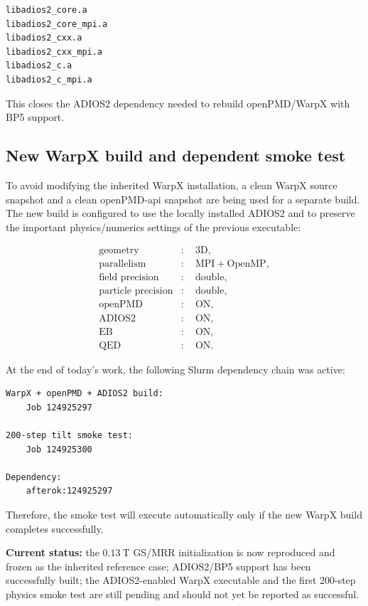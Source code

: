\documentclass[11pt,a4paper]{article}
\begin{document}
\begin{verbatim}
libadios2_core.a
libadios2_core_mpi.a
libadios2_cxx.a
libadios2_cxx_mpi.a
libadios2_c.a
libadios2_c_mpi.a
\end{verbatim}

This closes the ADIOS2 dependency needed to rebuild openPMD/WarpX with BP5
support.

\subsection{New WarpX build and dependent smoke test}

To avoid modifying the inherited WarpX installation, a clean WarpX source
snapshot and a clean openPMD-api snapshot are being used for a separate
build. The new build is configured to use the locally installed ADIOS2 and
to preserve the important physics/numerics settings of the previous
executable:

\begin{align*}
\text{geometry} &:\quad 3\mathrm{D},\\
\text{parallelism} &:\quad \mathrm{MPI}+\mathrm{OpenMP},\\
\text{field precision} &:\quad \mathrm{double},\\
\text{particle precision} &:\quad \mathrm{double},\\
\text{openPMD} &:\quad \mathrm{ON},\\
\text{ADIOS2} &:\quad \mathrm{ON},\\
\text{EB} &:\quad \mathrm{ON},\\
\text{QED} &:\quad \mathrm{ON}.
\end{align*}

At the end of today's work, the following Slurm dependency chain was active:

\begin{verbatim}
WarpX + openPMD + ADIOS2 build:
    Job 124925297

200-step tilt smoke test:
    Job 124925300

Dependency:
    afterok:124925297
\end{verbatim}

Therefore, the smoke test will execute automatically only if the new WarpX
build completes successfully.

\textbf{Current status:} the $0.13~\mathrm{T}$ GS/MRR initialization is now
reproduced and frozen as the inherited reference case; ADIOS2/BP5 support has
been successfully built; the ADIOS2-enabled WarpX executable and the first
200-step physics smoke test are still pending and should not yet be reported
as successful.
\end{document}
